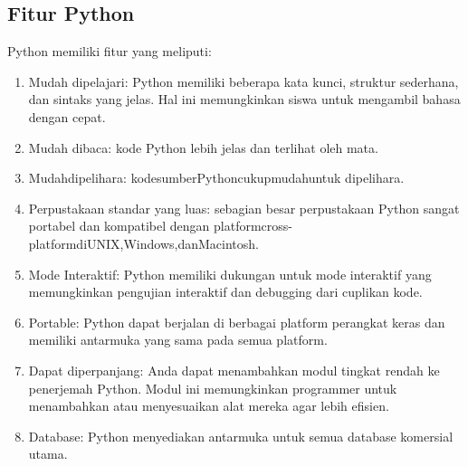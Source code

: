 \subsection{Fitur Python}
Python memiliki fitur yang meliputi:
	\begin{enumerate}
		\item Mudah dipelajari: Python memiliki beberapa kata kunci, struktur sederhana, dan sintaks yang jelas. Hal ini memungkinkan siswa untuk mengambil bahasa dengan cepat.
		\item Mudah dibaca: kode Python lebih jelas dan terlihat oleh mata.
		\item Mudahdipelihara: kodesumberPythoncukupmudahuntuk dipelihara.
		\item Perpustakaan standar yang luas: sebagian besar perpustakaan Python sangat portabel dan kompatibel dengan platformcross-platformdiUNIX,Windows,danMacintosh. 
		\item Mode Interaktif: Python memiliki dukungan untuk mode interaktif yang memungkinkan pengujian interaktif dan debugging dari cuplikan kode.
		\item Portable: Python dapat berjalan di berbagai platform perangkat keras dan memiliki antarmuka yang sama pada semua platform.
		\item Dapat diperpanjang: Anda dapat menambahkan modul tingkat rendah ke penerjemah Python. Modul ini memungkinkan programmer untuk menambahkan atau menyesuaikan alat mereka agar lebih eﬁsien.
		\item Database: Python menyediakan antarmuka untuk semua database komersial utama. 
	\end{enumerate}


